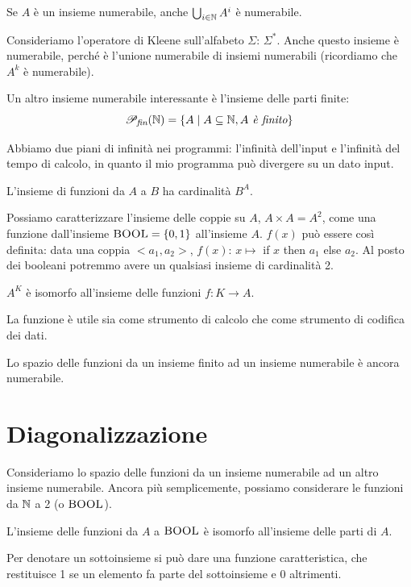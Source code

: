 \begin{lem}
    Se $A$ è un insieme numerabile, anche $\bigcup_{i \in \mathbb{N}} A^{i}$ è numerabile.
\end{lem}

Consideriamo l'operatore di Kleene sull'alfabeto $\Sigma$: $\Sigma^{*}$. Anche questo insieme è
numerabile, perché è l'unione numerabile di insiemi numerabili (ricordiamo che $A^{k}$ è numerabile).

Un altro insieme numerabile interessante è l'insieme delle parti finite:
\begin{equation*}
    \mathscr{P}_{\textit{fin}}(\mathbb{N}) = \{A \mid A \subseteq \mathbb{N}, \textit{$A$  è finito}\}
\end{equation*}

Abbiamo due piani di infinità nei programmi: l'infinità dell'input e l'infinità del tempo di
calcolo, in quanto il mio programma può divergere su un dato input.

L'insieme di funzioni da $A$ a $B$ ha cardinalità $B^{A}$.

Possiamo caratterizzare l'insieme delle coppie su $A$, $A \times A = A^{2}$, come una funzione
dall'insieme $\bm{\textsc{BOOL}} = \{0,1\}$ all'insieme $A$. $f(x)$ può essere così definita: data
una coppia $<a_{1},a_{2}>$, $f(x)$: $ x \mapsto $ if $x$ then $a_{1}$ else $a_{2}$. Al posto dei booleani potremmo
avere un qualsiasi insieme di cardinalità 2.

$A^{K}$ è isomorfo all'insieme delle funzioni $f: K \to A$.

La funzione è utile sia come strumento di calcolo che come strumento di codifica dei dati.

Lo spazio delle funzioni da un insieme finito ad un insieme numerabile è ancora numerabile.

\section{Diagonalizzazione}

Consideriamo lo spazio delle funzioni da un insieme numerabile ad un altro insieme numerabile.
Ancora più semplicemente, possiamo considerare le funzioni da $\mathbb{N}$ a 2 (o $\bm{\textsc{BOOL}}$).

L'insieme delle funzioni da $A$ a $\bm{\textsc{BOOL}}$ è isomorfo all'insieme delle parti di $A$.

Per denotare un sottoinsieme si può dare una funzione caratteristica, che restituisce 1 se un
elemento fa parte del sottoinsieme e 0 altrimenti.

